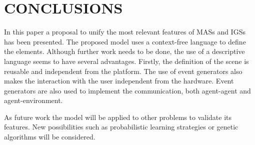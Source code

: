 \documentclass[a4paper,twoside]{article}
\begin{document}
\begin{table}[h]
\begin{center}
\begin{small}
\begin{tabular}{|p{0.11\linewidth}|p{0.75\linewidth}|}
    \hline
\end{tabular}
\end{small}
\end{center}
\vspace{-0.3cm}
\end{table}








\section{\uppercase{Conclusions}
\label{sec:conclusions}}

\noindent In this paper a proposal to unify the most relevant features of MASs and IGSs has been
presented. The proposed model uses a context-free language to define the elements. Although further
work needs to be done, the use of a descriptive language seems to have several advantages.
Firstly, the definition of the scene is reusable and independent from the platform.
The use of event generators also makes the interaction with the user
independent from the hardware. 
Event generators are also used to implement the communication,
both agent-agent and agent-environment.

As future work the model will be applied to other problems to validate its
features. New possibilities such as probabilistic learning strategies or genetic algorithms will
be considered.




\end{document}
